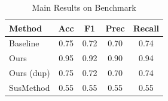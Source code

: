 \begin{table}
\caption{Main Results on Benchmark}
\begin{tabular}{lcccc}
\hline
Method & Acc & F1 & Prec & Recall \\
\hline
Baseline & 0.75 & 0.72 & 0.70 & 0.74 \\
Ours & 0.95 & 0.92 & 0.90 & 0.94 \\
Ours (dup) & 0.75 & 0.72 & 0.70 & 0.74 \\
SusMethod & 0.55 & 0.55 & 0.55 & 0.55 \\
\hline
\end{tabular}
\end{table}
